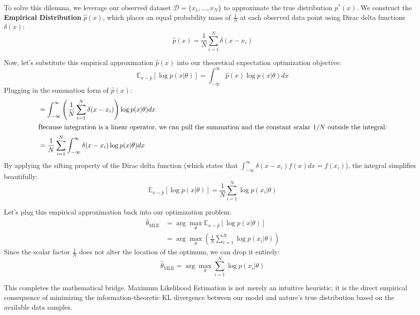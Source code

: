 \documentclass{article}
\begin{document}
To solve this dilemma, we leverage our observed dataset $\mathcal{D} = \{x_1, \dots, x_N\}$ to approximate the true distribution $p^*(x)$. We construct the \textbf{Empirical Distribution} $\hat{p}(x)$, which places an equal probability mass of $\frac{1}{N}$ at each observed data point using Dirac delta functions $\delta(x)$:
\begin{equation}
\hat{p}(x) = \frac{1}{N} \sum_{i=1}^N \delta(x - x_i)
\end{equation}

Now, let's substitute this empirical approximation $\hat{p}(x)$ into our theoretical expectation optimization objective:
\begin{equation}
\mathbb{E}_{x \sim \hat{p}}\left[\log p(x|\theta)\right] = \int_{-\infty}^{\infty} \hat{p}(x) \log p(x|\theta) dx
\end{equation}
Plugging in the summation form of $\hat{p}(x)$:
\begin{align*}
&= \int_{-\infty}^{\infty} \left( \frac{1}{N} \sum_{i=1}^N \delta(x - x_i) \right) \log p(x|\theta) dx \\
\intertext{Because integration is a linear operator, we can pull the summation and the constant scalar $1/N$ outside the integral:}
&= \frac{1}{N} \sum_{i=1}^N \int_{-\infty}^{\infty} \delta(x - x_i) \log p(x|\theta) dx
\end{align*}
By applying the sifting property of the Dirac delta function (which states that $\int_{-\infty}^{\infty} \delta(x - x_i) f(x) dx = f(x_i)$), the integral simplifies beautifully:
\begin{equation}
\mathbb{E}_{x \sim \hat{p}}\left[\log p(x|\theta)\right] = \frac{1}{N} \sum_{i=1}^N \log p(x_i|\theta)
\end{equation}

Let's plug this empirical approximation back into our optimization problem:
\begin{align*}
\hat{\theta}_{\text{MLE}} &= \arg\max_{\theta} \mathbb{E}_{x \sim \hat{p}}\left[\log p(x|\theta)\right] \\
&= \arg\max_{\theta} \left( \frac{1}{N} \sum_{i=1}^N \log p(x_i|\theta) \right)
\end{align*}
Since the scalar factor $\frac{1}{N}$ does not alter the location of the optimum, we can drop it entirely:
\begin{equation}
\hat{\theta}_{\text{MLE}} = \arg\max_{\theta} \sum_{i=1}^N \log p(x_i|\theta)
\end{equation}

This completes the mathematical bridge. Maximum Likelihood Estimation is not merely an intuitive heuristic; it is the direct empirical consequence of minimizing the information-theoretic KL divergence between our model and nature's true distribution based on the available data samples.
\end{document}
